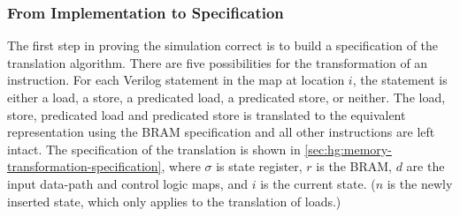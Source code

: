 \subsubsection{From Implementation to Specification}

The first step in proving the simulation correct is to build a specification of
the translation algorithm.  There are five possibilities for the transformation
of an instruction. For each Verilog statement in the map at location $i$, the
statement is either a load, a store, a predicated load, a predicated store, or
neither. The load, store, predicated load and predicated store is translated to
the equivalent representation using the \gls{BRAM} specification and all other
instructions are left intact.  The specification of the translation is shown in
\cref{sec:hg:memory-transformation-specification}, where $\sigma$ is state
register, $r$ is the \gls{BRAM}, $d$ are the input data-path and control logic maps,
and $i$ is the current state.  ($n$ is the newly inserted state, which only
applies to the translation of loads.)

\newcommand\nonblockasgn{\mathrel{\texttt{<=}}}
\newcommand\blockasgn{\mathrel{\texttt{=}}}
\newcommand\msemi{\texttt{;}\ }
\newcommand\mternary[3]{#1\mathbin{\texttt{?}}#2\mathbin{\texttt{:}}#3}
\newcommand\mxor{\oplus}
\newcommand\verilogeq{\mathbin{\texttt{==}}}

